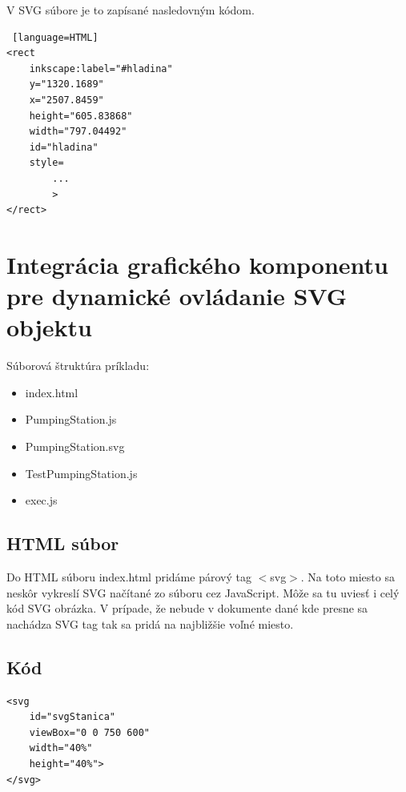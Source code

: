 V SVG súbore je to zapísané nasledovným kódom. 


\begin{lstlisting} [language=HTML]
<rect
	inkscape:label="#hladina"
	y="1320.1689"
	x="2507.8459"
	height="605.83868"
	width="797.04492"
	id="hladina"
	style=
		...
        >
</rect>

\end{lstlisting}


%
%
%
%









%










\section{Integrácia grafického komponentu pre dynamické ovládanie SVG objektu}

Súborová štruktúra príkladu: 
\begin{itemize}
	\item index.html 
	\item PumpingStation.js
	\item PumpingStation.svg
	\item TestPumpingStation.js
	\item exec.js 
\end{itemize}

\subsection{HTML súbor}
Do HTML súboru index.html pridáme párový tag $<$svg$>$. Na toto miesto sa neskôr vykreslí SVG načítané zo súboru cez JavaScript. Môže sa tu uviesť i celý kód SVG obrázka. V prípade, že nebude v dokumente dané kde presne sa nachádza SVG tag tak sa pridá na najbližšie voľné miesto. 
\subsection{Kód}
\begin{lstlisting}
<svg 
	id="svgStanica" 
	viewBox="0 0 750 600" 
	width="40%" 
	height="40%"> 
</svg>
\end{lstlisting}

